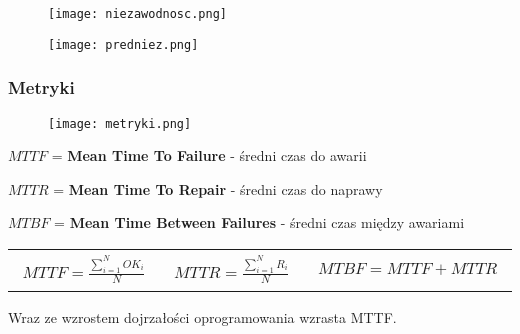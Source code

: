 \documentclass[../main.tex]{subfiles}
\begin{document}
    \begin{figure}[H]
        \texttt{[image: niezawodnosc.png]}
    \end{figure}

    \begin{figure}[H]
        \texttt{[image: predniez.png]}
    \end{figure}


    \subsubsection{Metryki}

    \begin{figure}[H]
        \texttt{[image: metryki.png]}
    \end{figure}

    $MTTF$ = \textbf{Mean Time To Failure} - średni czas do awarii

    $MTTR$ = \textbf{Mean Time To Repair} - średni czas do naprawy

    $MTBF$ = \textbf{Mean Time Between Failures} - średni czas między awariami

    \begin{table}[H]
        \begin{center}
            \begin{tabular}{p{5cm} p{5cm} p{5cm}}
                \begin{align*}
                    MTTF = \frac{\sum_{i=1}^{N} OK_i}{N}
                \end{align*}
                &
                \begin{align*}
                    MTTR = \frac{\sum_{i=1}^{N} R_i}{N}
                \end{align*}
                &
                \begin{align*}
                    MTBF = MTTF + MTTR
                \end{align*}
            \end{tabular}
        \end{center}
    \end{table}
    Wraz ze wzrostem dojrzałości oprogramowania wzrasta MTTF.
\end{document}
